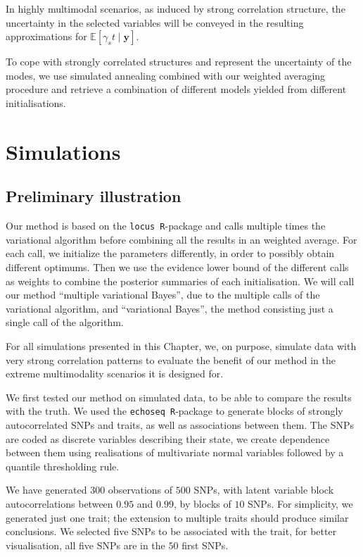 \documentclass[a4paper, 11pt]{report}
\numberwithin{equation}{chapter}
\begin{document}
In highly multimodal scenarios, as induced by strong correlation structure, the uncertainty in the selected variables will be conveyed in the resulting approximations for $\mathbb{E}\left[\gamma_st\mid \boldsymbol{y}\right]$.

To cope with strongly correlated structures and represent the uncertainty of the modes, we use simulated annealing combined with our weighted averaging procedure and retrieve a combination of different models yielded from different initialisations.

\newpage
\chapter{Simulations}
\section{Preliminary illustration}
Our method is based on the \texttt{locus R}-package \cite{r_locus} and calls multiple times the variational algorithm before combining all the results in an weighted average. For each call, we initialize the parameters differently, in order to possibly obtain different optimums. Then we use the evidence lower bound of the different calls as weights to combine the posterior summaries of each initialisation. We will call our method ``multiple variational Bayes'', due to the multiple calls of the variational algorithm, and ``variational Bayes'', the method consisting just a single call of the algorithm.

For all simulations presented in this Chapter, we, on purpose, simulate data with very strong correlation patterns to evaluate the benefit of our method in the extreme multimodality scenarios it is designed for.

We first tested our method on simulated data, to be able to compare the results with the truth. We used the \texttt{echoseq R}-package \cite{r_echoseq} to generate blocks of strongly autocorrelated SNPs and traits, as well as associations between them. The SNPs are coded as discrete variables describing their state, we create dependence between them using realisations of multivariate normal variables followed by a quantile thresholding rule.

We have generated $300$ observations of $500$ SNPs, with latent variable block autocorrelations between $0.95$ and $0.99$, by blocks of $10$ SNPs. For simplicity, we generated just one trait; the extension to multiple traits should produce similar conclusions. We selected five SNPs to be associated with the trait, for better visualisation, all five SNPs are in the $50$ first SNPs.
\end{document}
